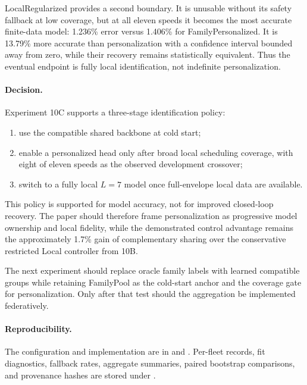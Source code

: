 LocalRegularized provides a second boundary. It is unusable without its safety
fallback at low coverage, but at all eleven speeds it becomes the most accurate
finite-data model: 1.236\% error versus 1.406\% for FamilyPersonalized. It is
13.79\% more accurate than personalization with a confidence interval bounded
away from zero, while their recovery remains statistically equivalent. Thus the
eventual endpoint is fully local identification, not indefinite personalization.

\paragraph{Decision.}
Experiment 10C supports a three-stage identification policy:
\begin{enumerate}
 \item use the compatible shared backbone at cold start;
 \item enable a personalized head only after broad local scheduling coverage,
 with eight of eleven speeds as the observed development crossover;
 \item switch to a fully local $L=7$ model once full-envelope local data are
 available.
\end{enumerate}
This policy is supported for model accuracy, not for improved closed-loop
recovery. The paper should therefore frame personalization as progressive model
ownership and local fidelity, while the demonstrated control advantage remains
the approximately 1.7\% gain of complementary sharing over the conservative
restricted Local controller from 10B.

The next experiment should replace oracle family labels with learned compatible
groups while retaining FamilyPool as the cold-start anchor and the coverage
gate for personalization. Only after that test should the aggregation be
implemented federatively.

\paragraph{Reproducibility.}
The configuration and implementation are in
 and
. Per-fleet
records, fit diagnostics, fallback rates, aggregate summaries, paired bootstrap
comparisons, and provenance hashes are stored under .
